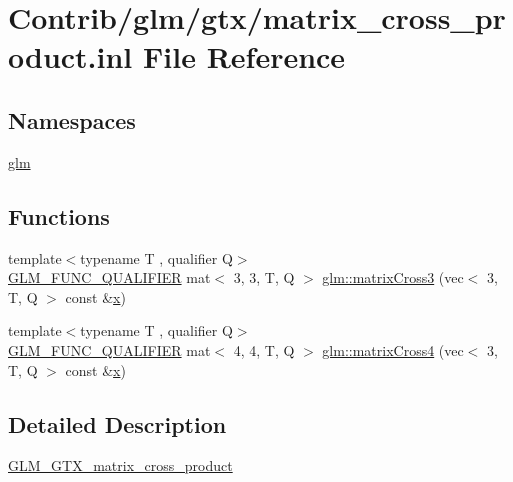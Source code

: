 \hypertarget{matrix__cross__product_8inl}{}\section{Contrib/glm/gtx/matrix\+\_\+cross\+\_\+product.inl File Reference}
\label{matrix__cross__product_8inl}
\subsection*{Namespaces}
\begin{DoxyCompactItemize}
\item 
 \mbox{\hyperlink{namespaceglm}{glm}}
\end{DoxyCompactItemize}
\subsection*{Functions}
\begin{DoxyCompactItemize}
\item 
{\footnotesize template$<$typename T , qualifier Q$>$ }\\\mbox{\hyperlink{setup_8hpp_a33fdea6f91c5f834105f7415e2a64407}{G\+L\+M\+\_\+\+F\+U\+N\+C\+\_\+\+Q\+U\+A\+L\+I\+F\+I\+ER}} mat$<$ 3, 3, T, Q $>$ \mbox{\hyperlink{group__gtx__matrix__cross__product_ga5802386bb4c37b3332a3b6fd8b6960ff}{glm\+::matrix\+Cross3}} (vec$<$ 3, T, Q $>$ const \&\mbox{\hyperlink{_s_d_l__opengl_8h_ad0e63d0edcdbd3d79554076bf309fd47}{x}})
\item 
{\footnotesize template$<$typename T , qualifier Q$>$ }\\\mbox{\hyperlink{setup_8hpp_a33fdea6f91c5f834105f7415e2a64407}{G\+L\+M\+\_\+\+F\+U\+N\+C\+\_\+\+Q\+U\+A\+L\+I\+F\+I\+ER}} mat$<$ 4, 4, T, Q $>$ \mbox{\hyperlink{group__gtx__matrix__cross__product_ga20057fff91ddafa102934adb25458cde}{glm\+::matrix\+Cross4}} (vec$<$ 3, T, Q $>$ const \&\mbox{\hyperlink{_s_d_l__opengl_8h_ad0e63d0edcdbd3d79554076bf309fd47}{x}})
\end{DoxyCompactItemize}


\subsection{Detailed Description}
\mbox{\hyperlink{group__gtx__matrix__cross__product}{G\+L\+M\+\_\+\+G\+T\+X\+\_\+matrix\+\_\+cross\+\_\+product}} 